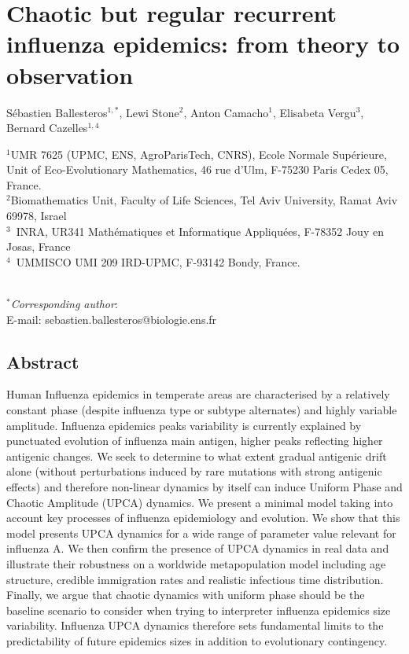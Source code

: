 \chapter{Chaotic but regular recurrent influenza epidemics: from
  theory to observation}


Sébastien Ballesteros$^{1,*}$,
Lewi Stone$^{2}$,
Anton Camacho$^{1}$,
Elisabeta Vergu$^{3}$,
Bernard Cazelles$^{1,4}$

\vspace{2cm}

$^1$UMR 7625  (UPMC, ENS, AgroParisTech, CNRS), Ecole Normale
Supérieure, Unit of Eco-Evolutionary Mathematics,  46 rue d'Ulm,
F-75230 Paris Cedex 05, France. \\
$^2$Biomathematics Unit, Faculty of Life Sciences, Tel Aviv
University, Ramat Aviv 69978, Israel \\
$^3$~INRA, UR341 Mathématiques et Informatique Appliquées, F-78352 Jouy en Josas, France \\
$^4$~UMMISCO UMI 209 IRD-UPMC, F-93142 Bondy, France.

~\\
$^*$\textit{Corresponding author}:  \\
E-mail: sebastien.ballesteros@biologie.ens.fr

\section*{Abstract}


Human Influenza epidemics in temperate areas are characterised by a
relatively constant phase (despite influenza type or subtype
alternates) and highly variable amplitude. Influenza epidemics peaks
variability is currently explained by punctuated evolution of
influenza main antigen, higher peaks reflecting higher antigenic
changes.  We seek to determine to what extent gradual antigenic drift
alone (without perturbations induced by rare mutations with strong
antigenic effects) and therefore non-linear dynamics by itself can
induce Uniform Phase and Chaotic Amplitude (UPCA) dynamics. We present
a minimal model taking into account key processes of influenza
epidemiology and evolution. We show that this model presents UPCA
dynamics for a wide range of parameter value relevant for influenza
A. We then confirm the presence of UPCA dynamics in real data and
illustrate their robustness on a worldwide metapopulation model
including age structure, credible immigration rates and realistic
infectious time distribution. Finally, we argue that chaotic dynamics
with uniform phase should be the baseline scenario to consider when
trying to interpreter influenza epidemics size variability.  Influenza
UPCA dynamics therefore sets fundamental limits to the predictability
of future epidemics sizes in addition to evolutionary contingency.

